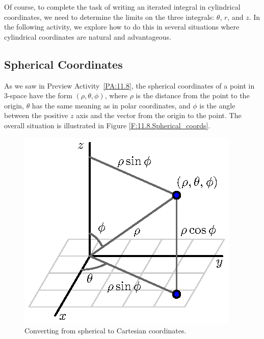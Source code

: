 \vspace*{5pt}
\nin {}
\vspace*{5pt}

Of course, to complete the task of writing an iterated integral in cylindrical coordinates, we need to determine the limits on the three integrals: $\theta$, $r$, and $z$.  In the following activity, we explore how to do this in several situations where cylindrical coordinates are natural and advantageous.

\newpage



\subsection*{Spherical Coordinates}

As we saw in Preview Activity~\ref{PA:11.8}, the spherical coordinates of a point in 3-space have the form $(\rho, \theta, \phi)$, where $\rho$ is the distance from the point to the origin, $\theta$ has the same meaning as in polar coordinates, and $\phi$ is the angle between the positive $z$ axis and the vector from the origin to the point.  The overall situation is  illustrated in Figure \ref{F:11.8.Spherical_coords}.

\begin{figure}[ht]
\begin{center}
  \includegraphics{figures/fig_11_8_spherical_explain.eps}
\end{center}
\caption{Converting from spherical to Cartesian coordinates.}
\label{F:11.8.Spherical_to_Cartesian}
\end{figure}

